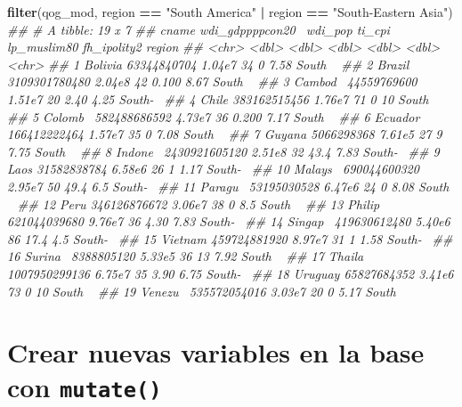 \documentclass[]{book}
\newenvironment{Shaded}{\begin{snugshade}}{\end{snugshade}}
\newcommand{\CommentTok}[1]{\textcolor[rgb]{0.56,0.35,0.01}{\textit{#1}}}
\newcommand{\KeywordTok}[1]{\textcolor[rgb]{0.13,0.29,0.53}{\textbf{#1}}}
\newcommand{\NormalTok}[1]{#1}
\newcommand{\OperatorTok}[1]{\textcolor[rgb]{0.81,0.36,0.00}{\textbf{#1}}}
\newcommand{\StringTok}[1]{\textcolor[rgb]{0.31,0.60,0.02}{#1}}
\begin{document}
\begin{Shaded}
\begin{Highlighting}[]
\KeywordTok{filter}\NormalTok{(qog_mod, region }\OperatorTok{==}\StringTok{ "South America"} \OperatorTok{|}\StringTok{ }\NormalTok{region }\OperatorTok{==}\StringTok{ "South-Eastern Asia"}\NormalTok{)}
\CommentTok{## # A tibble: 19 x 7}
\CommentTok{##    cname   wdi_gdppppcon20~ wdi_pop ti_cpi lp_muslim80 fh_ipolity2 region }
\CommentTok{##    <chr>              <dbl>   <dbl>  <dbl>       <dbl>       <dbl> <chr>  }
\CommentTok{##  1 Bolivia      63344840704  1.04e7     34       0            7.58 South ~}
\CommentTok{##  2 Brazil     3109301780480  2.04e8     42       0.100        8.67 South ~}
\CommentTok{##  3 Cambod~      44559769600  1.51e7     20       2.40         4.25 South-~}
\CommentTok{##  4 Chile       383162515456  1.76e7     71       0           10    South ~}
\CommentTok{##  5 Colomb~     582488686592  4.73e7     36       0.200        7.17 South ~}
\CommentTok{##  6 Ecuador     166412222464  1.57e7     35       0            7.08 South ~}
\CommentTok{##  7 Guyana        5066298368  7.61e5     27       9            7.75 South ~}
\CommentTok{##  8 Indone~    2430921605120  2.51e8     32      43.4          7.83 South-~}
\CommentTok{##  9 Laos         31582838784  6.58e6     26       1            1.17 South-~}
\CommentTok{## 10 Malays~     690044600320  2.95e7     50      49.4          6.5  South-~}
\CommentTok{## 11 Paragu~      53195030528  6.47e6     24       0            8.08 South ~}
\CommentTok{## 12 Peru        346126876672  3.06e7     38       0            8.5  South ~}
\CommentTok{## 13 Philip~     621044039680  9.76e7     36       4.30         7.83 South-~}
\CommentTok{## 14 Singap~     419630612480  5.40e6     86      17.4          4.5  South-~}
\CommentTok{## 15 Vietnam     459724881920  8.97e7     31       1            1.58 South-~}
\CommentTok{## 16 Surina~       8388805120  5.33e5     36      13            7.92 South ~}
\CommentTok{## 17 Thaila~    1007950299136  6.75e7     35       3.90         6.75 South-~}
\CommentTok{## 18 Uruguay      65827684352  3.41e6     73       0           10    South ~}
\CommentTok{## 19 Venezu~     535572054016  3.03e7     20       0            5.17 South ~}
\end{Highlighting}
\end{Shaded}

\hypertarget{crear-nuevas-variables-en-la-base-con-mutate}{%
\section{\texorpdfstring{Crear nuevas variables en la base con
\texttt{mutate()}}{Crear nuevas variables en la base con mutate()}}\label{crear-nuevas-variables-en-la-base-con-mutate}}
\end{document}
